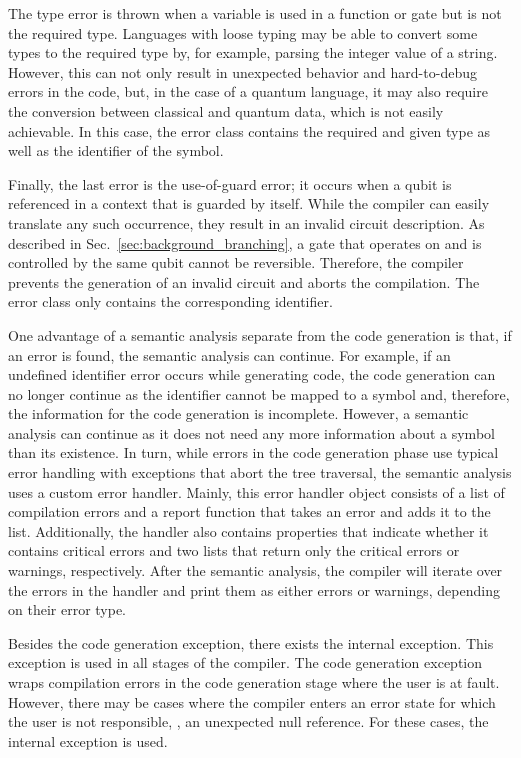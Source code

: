 The type error is thrown when a variable is used in a function or gate but is not the required type. Languages with loose typing may be able to convert some types to the required type by, for example, parsing the integer value of a string. However, this can not only result in unexpected behavior and hard-to-debug errors in the code, but, in the case of a quantum language, it may also require the conversion between classical and quantum data, which is not easily achievable. In this case, the error class contains the required and given type as well as the identifier of the symbol.

Finally, the last error is the use-of-guard error; it occurs when a qubit is referenced in a context that is guarded by itself. While the compiler can easily translate any such occurrence, they result in an invalid circuit description. As described in Sec.~\ref{sec:background_branching}, a gate that operates on and is controlled by the same qubit cannot be reversible. Therefore, the compiler prevents the generation of an invalid circuit and aborts the compilation. The error class only contains the corresponding identifier.

One advantage of a semantic analysis separate from the code generation is that, if an error is found, the semantic analysis can continue. For example, if an undefined identifier error occurs while generating code, the code generation can no longer continue as the identifier cannot be mapped to a symbol and, therefore, the information for the code generation is incomplete. However, a semantic analysis can continue as it does not need any more information about a symbol than its existence. In turn, while errors in the code generation phase use typical error handling with exceptions that abort the tree traversal, the semantic analysis uses a custom error handler. Mainly, this error handler object consists of a list of compilation errors and a report function that takes an error and adds it to the list. Additionally, the handler also contains properties that indicate whether it contains critical errors and two lists that return only the critical errors or warnings, respectively. After the semantic analysis, the compiler will iterate over the errors in the handler and print them as either errors or warnings, depending on their error type.

Besides the code generation exception, there exists the internal exception. This exception is used in all stages of the compiler. The code generation exception wraps compilation errors in the code generation stage where the user is at fault. However, there may be cases where the compiler enters an error state for which the user is not responsible, \eg, an unexpected null reference. For these cases, the internal exception is used.